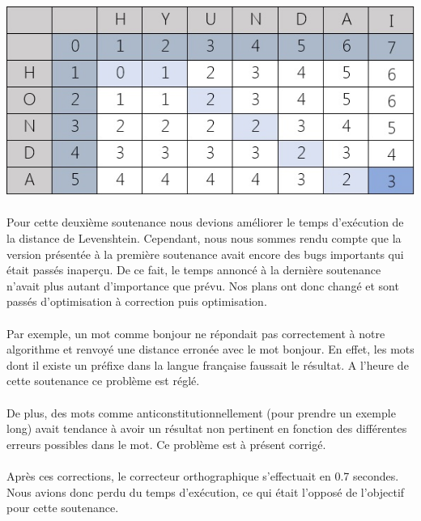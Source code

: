 \documentclass{article}
\begin{document}
\begin{center}
	\includegraphics[scale=0.5]{matrice}
\end{center}

\newpage

\paragraph{}Pour cette deuxième soutenance nous devions améliorer le temps d’exécution de la distance de Levenshtein. Cependant, nous nous sommes rendu compte que la version présentée à la première soutenance avait encore des bugs importants qui était passés inaperçu. De ce fait, le temps annoncé à la dernière soutenance n’avait plus autant d’importance que prévu. Nos plans ont donc changé et sont passés d’optimisation à correction puis optimisation.

\paragraph{}Par exemple, un mot comme bonjour ne répondait pas correctement à notre algorithme et renvoyé une distance erronée avec le mot bonjour. En effet, les mots dont il existe un préfixe dans la langue française faussait le résultat. A l’heure de cette soutenance ce problème est réglé.
\paragraph{}De plus, des mots comme anticonstitutionnellement (pour prendre un exemple long) avait tendance à avoir un résultat non pertinent en fonction des différentes erreurs possibles dans le mot. Ce problème est à présent corrigé.
\paragraph{}Après ces corrections, le correcteur orthographique s’effectuait en 0.7 secondes. Nous avions donc perdu du temps d’exécution, ce qui était l’opposé de l’objectif pour cette soutenance.
\end{document}
